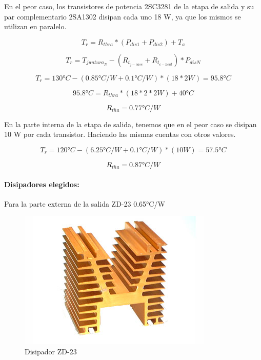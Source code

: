 \documentclass[a4paper,12pt,twoside]{article}
\begin{document}
En el peor caso, los transistores de potencia 2SC3281 de la etapa de salida y su par complementario 2SA1302
disipan cada uno 18 W, ya que los mismos se utilizan en paralelo.

\begin{equation*}
T_r = R_{thra} * (P_{dis1}+P_{dis2}) + T_a
\end{equation*}

\begin{equation*}
T_r = T_{juntura_{N}} - (R_{t_{j-case}}+R_{t_{c-heat}})*P_{disN}
\end{equation*}

\begin{equation*}
T_r = 130°C - (0.85 °C/W + 0.1 °C/W)*(18*2 W) = 95.8 °C
\end{equation*}

\begin{equation*}
95.8°C = R_{thra}*(18*2*2 W) + 40°C
\end{equation*}

\begin{equation*}
R_{tha} = 0.77 °C/W
\end{equation*}

En la  parte interna de la etapa de salida, tenemos que en el peor caso se disipan 10 W por cada transistor.
Haciendo las mismas cuentas con otros valores.


\begin{equation*}
T_r = 120°C - (6.25°C/W + 0.1°C/W)*(10W) = 57.5 °C
\end{equation*}

\begin{equation*}
R_{tha} = 0.87 °C/W
\end{equation*}

\paragraph{Disipadores elegidos:}

Para la parte externa de la salida ZD-23 0.65°C/W

\begin{figure}[H]
    \centering
    \includegraphics[height=0.4\textwidth]{img/zd23.jpg}
    \caption{Disipador ZD-23}
    \label{fig:diszd23}
\end{figure}
\end{document}
